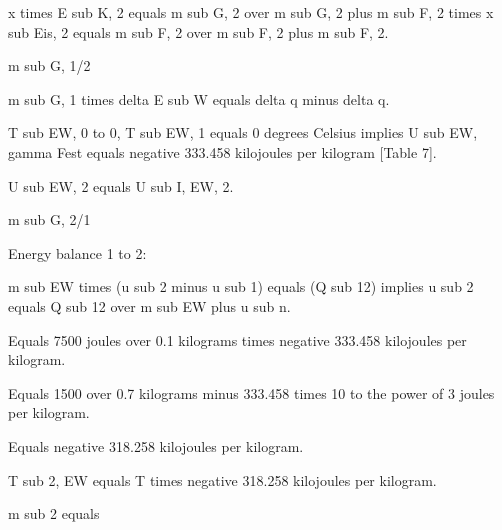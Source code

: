 x times E sub K, 2 equals m sub G, 2 over m sub G, 2 plus m sub F, 2 times x sub Eis, 2 equals m sub F, 2 over m sub F, 2 plus m sub F, 2.

m sub G, 1/2

m sub G, 1 times delta E sub W equals delta q minus delta q.

T sub EW, 0 to 0, T sub EW, 1 equals 0 degrees Celsius implies U sub EW, gamma Fest equals negative 333.458 kilojoules per kilogram [Table 7].

U sub EW, 2 equals U sub I, EW, 2.

m sub G, 2/1

Energy balance 1 to 2:

m sub EW times (u sub 2 minus u sub 1) equals (Q sub 12) implies u sub 2 equals Q sub 12 over m sub EW plus u sub n.

Equals 7500 joules over 0.1 kilograms times negative 333.458 kilojoules per kilogram.

Equals 1500 over 0.7 kilograms minus 333.458 times 10 to the power of 3 joules per kilogram.

Equals negative 318.258 kilojoules per kilogram.

T sub 2, EW equals T times negative 318.258 kilojoules per kilogram.

m sub 2 equals